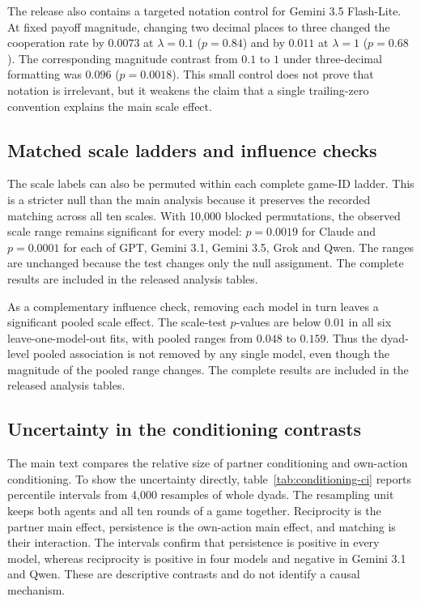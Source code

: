 \documentclass[11pt,a4paper]{article}
\begin{document}
The release also contains a targeted notation control for Gemini 3.5 Flash-Lite.
At fixed payoff magnitude, changing two decimal places to three changed the
cooperation rate by $0.0073$ at $\lambda=0.1$ ($p=0.84$) and by $0.011$ at
$\lambda=1$ ($p=0.68$). The corresponding magnitude contrast from $0.1$ to $1$
under three-decimal formatting was $0.096$ ($p=0.0018$). This small control
does not prove that notation is irrelevant, but it weakens the claim that a
single trailing-zero convention explains the main scale effect.


\subsection{Matched scale ladders and influence checks}\label{appendix:robust_ladders}

The scale labels can also be permuted within each complete game-ID ladder. This
is a stricter null than the main analysis because it preserves the recorded
matching across all ten scales. With 10,000 blocked permutations, the observed
scale range remains significant for every model: $p=0.0019$ for Claude and
$p=0.0001$ for each of GPT, Gemini 3.1, Gemini 3.5, Grok and Qwen. The ranges
are unchanged because the test changes only the null assignment. The complete
results are included in the released analysis tables.

As a complementary influence check, removing each model in turn leaves a
significant pooled scale effect. The scale-test $p$-values are below $0.01$ in
all six leave-one-model-out fits, with pooled ranges from $0.048$ to $0.159$.
Thus the dyad-level pooled association is not removed by any single model,
even though the magnitude of the pooled range changes. The complete results are included in the
released analysis tables.

\subsection{Uncertainty in the conditioning contrasts}\label{appendix:conditioning_ci}

The main text compares the relative size of partner conditioning and own-action
conditioning. To show the uncertainty directly, table~\ref{tab:conditioning-ci}
reports percentile intervals from 4,000 resamples of whole dyads. The resampling
unit keeps both agents and all ten rounds of a game together. Reciprocity is the
partner main effect, persistence is the own-action main effect, and matching is
their interaction. The intervals confirm that persistence is positive in every
model, whereas reciprocity is positive in four models and negative in Gemini
3.1 and Qwen. These are descriptive contrasts and do not identify a causal
mechanism.
\end{document}
